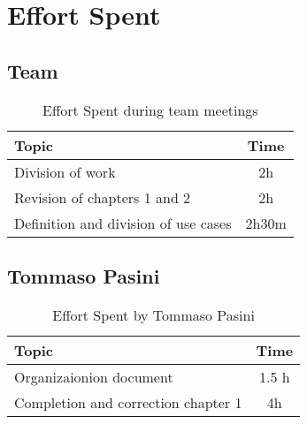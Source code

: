 \chapter{Effort Spent}

\section*{Team}


\begin{table}[ht]
    \centering
    \begin{tabular}{|l|c|}
        \hline
        \textbf{Topic}                       & \textbf{Time} \\ \hline
        Division of work                     & 2h            \\ \hline
        Revision of chapters 1 and 2         & 2h            \\ \hline
        Definition and division of use cases & 2h30m         \\ \hline
    \end{tabular}
    \caption{Effort Spent during team meetings}
    \label{tab:group-effort-spent}
\end{table}

\section*{Tommaso Pasini}
\begin{table}[ht]
    \centering
    \begin{tabular}{|l|c|}
        \hline
        \textbf{Topic}                      & \textbf{Time} \\ \hline
        Organizaionion document             & 1.5 h         \\ \hline
        Completion and correction chapter 1 & 4h            \\ \hline
    \end{tabular}
    \caption{Effort Spent by Tommaso Pasini}
    \label{tab:pasini-effort-spent}
\end{table}

